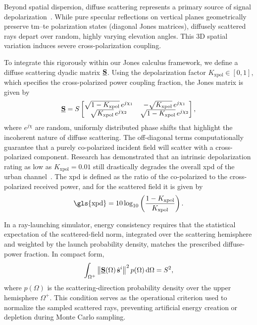 Beyond spatial dispersion, diffuse scattering represents a primary source of signal depolarization~. While pure specular reflections on vertical planes geometrically preserve \gls{tm}--\gls{te} polarization states (diagonal Jones matrices), diffusely scattered rays depart over random, highly varying elevation angles. This 3D spatial variation induces severe cross-polarization coupling.

To integrate this rigorously within our Jones calculus framework, we define a diffuse scattering dyadic matrix $\underline{\mathbf{S}}$. Using the depolarization factor $K_{\mathrm{xpol}} \in [0, 1]$, which specifies the cross-polarized power coupling fraction, the Jones matrix is given by
\begin{equation}\label{eq:diffuse-scattering-dyadic}
  \underline{\mathbf{S}} = S
  \begin{bmatrix}
    \sqrt{1 - K_{\mathrm{xpol}}} \, e^{j\chi_{1}} & -\sqrt{K_{\mathrm{xpol}}} \, e^{j\chi_{1}} \\
    \sqrt{K_{\mathrm{xpol}}} \, e^{j\chi_{2}} & \sqrt{1 - K_{\mathrm{xpol}}} \, e^{j\chi_{2}}
  \end{bmatrix},
\end{equation}
where $e^{j\chi}$ are random, uniformly distributed phase shifts that highlight the incoherent nature of diffuse scattering. The off-diagonal terms computationally guarantee that a purely co-polarized incident field will scatter with a cross-polarized component. Research has demonstrated that an intrinsic depolarization rating as low as $K_{\mathrm{xpol}} = 0.01$ still drastically degrades the overall \gls{xpd} of the urban channel~. The \gls{xpd} is defined as the ratio of the co-polarized to the cross-polarized received power, and for the scattered field it is given by
\begin{equation}
  \text{\gls{xpd}} = 10 \log_{10}\left(\frac{1 - K_{\mathrm{xpol}}}{K_{\mathrm{xpol}}}\right).
\end{equation}

In a ray-launching simulator, energy consistency requires that the statistical expectation of the scattered-field norm, integrated over the scattering hemisphere and weighted by the launch probability density, matches the prescribed diffuse-power fraction. In compact form,
\begin{equation}
  \int_{\Omega^+} \left\|\underline{\mathbf{S}}(\Omega)\,\hat{\mathbf{s}}^{i}\right\|^2 p(\Omega)\,\mathrm{d}\Omega = S^2,
\end{equation}
where $p(\Omega)$ is the scattering-direction probability density over the upper hemisphere $\Omega^+$. This condition serves as the operational criterion used to normalize the sampled scattered rays, preventing artificial energy creation or depletion during Monte Carlo sampling.

